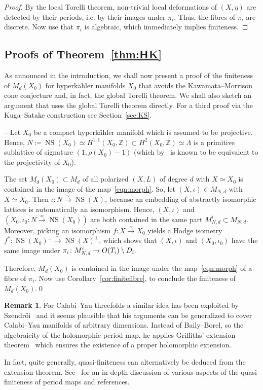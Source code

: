 \documentclass[11pt]{article}
\makeatletter
\theoremstyle{definition}
\newtheorem{rema}[theo]{Remark}
\numberwithin{equation}{section}
\numberwithin{figure}{section}
\numberwithin{table}{section}
\DeclareMathOperator{\NS}{NS}
\newcommand{\OO}{{\rm O}}
\newcommand{\ZZ}{\mathbb{Z}}
\newcommand{\congpf}{\overset{\sim}{\rightarrow}}%
\renewcommand{\cong}{\simeq}
\makeatother
\begin{document}
\begin{proof}
By the local Torelli theorem, non-trivial local deformations of $(X,\eta)$ are detected by their periods, i.e. by their images under $\pi_i$. Thus, the fibres of $\pi_i$ are discrete. Now use that $\pi_i$ is algebraic, which immediately implies finiteness.
\end{proof}


\subsection{Proofs of Theorem~\ref{thm:HK}}\label{sec:proof}
As announced in the introduction, we shall now present a proof of the finiteness of $M_d(X_0)$ for hyperk\"ahler manifolds $X_0$ that avoids the Kawamata--Morrison cone conjecture and, in fact, the global Torelli theorem. We shall also sketch an argument that uses the global Torelli theorem directly. For a third proof via the Kuga--Satake construction see Section~\ref{sec:KS}.

\medskip

-- Let $X_0$ be a compact hyperk\"ahler manifold which is assumed to be projective. Hence, $N\coloneqq \NS(X_0)\cong H^{1,1}(X_0,\ZZ)\subset H^2(X_0,\ZZ)\cong\Lambda$ is a primitive sublattice of signature $(1,\rho(X_0)-1)$ (which by~\cite{HuyHK} is known to be equivalent to the projectivity of $X_0$).

The set $M_d(X_0)\subset {M}_d$ of all polarized $(X,L)$ of degree $d$ with $X\cong X_0$ is contained in the image of the map~\eqref{eqn:morph}. So, let $(X,\iota)\in M_{N,d}$ with $X\cong X_0$. Then $\iota\colon N\congpf \NS(X)$, because an embedding of abstractly isomorphic lattices is automatically an isomorphism. Hence, $(X,\iota)$ and $(X_0,\iota_0\colon N\stackrel{=}{\to}\NS(X_0))$ are both contained in the same part $M^i_{N,d}\subset M_{N,d}$. Moreover, picking an isomorphism $f\colon X\congpf X_0$ yields a Hodge isometry $f^*\colon\NS(X_0)^\perp\congpf \NS(X)^\perp$, which shows that $(X,\iota)$ and $(X_0,\iota_0)$ have the same image under $\pi_i\colon M^i_{N,d}\to \OO(T_i)\setminus D_i$.

Therefore, $M_d(X_0)$ is contained in the image under the map~\eqref{eqn:morph} of a fibre of $\pi_i$. Now use Corollary~\ref{cor:finitefibre}, to conclude the finiteness of $M_d(X_0)$.\qed

\begin{rema}
For Calabi--Yau threefolds a similar idea has been exploited by Szendr\H{o}i~\cite{Szendroi} and it seems plausible that his arguments can be generalized to cover Calabi--Yau manifolds of arbitrary dimensions. Instead of Baily--Borel, so the algebraicity of the holomorphic period map, he applies Griffiths' extension theorem~\cite{CGGH} which ensures the existence of a proper holomorphic extension.

In fact, quite generally, quasi-finiteness can alternatively be deduced from the extension theorem. See~\cite{JL} for an in depth discussion of various aspects of the quasi-finiteness of period maps and references.
\end{rema}
\end{document}
